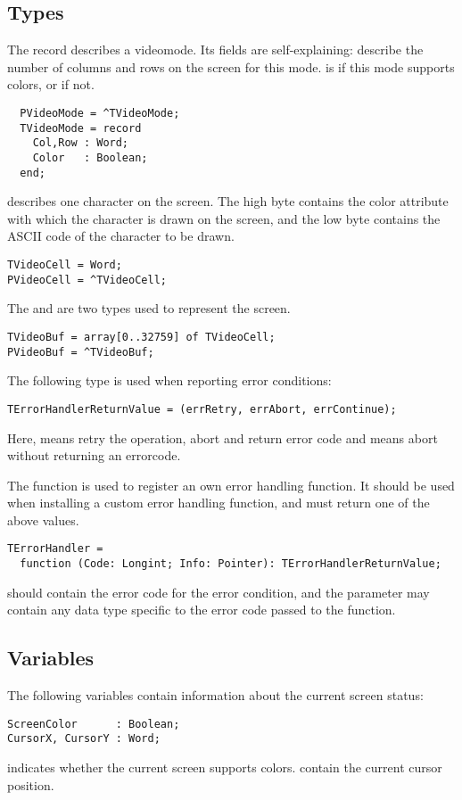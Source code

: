 \subsection{Types}
The  record describes a videomode. Its fields are
self-explaining:  describe the number of columns and 
rows on the screen for this mode.  is  if this mode
supports colors, or  if not.
\begin{verbatim}
  PVideoMode = ^TVideoMode;
  TVideoMode = record
    Col,Row : Word;
    Color   : Boolean;
  end;
\end{verbatim}
 describes one character on the screen. The high byte
contains the color attribute with which the character is drawn on the screen,
and the low byte contains the ASCII code of the character to be drawn.
\begin{verbatim}
TVideoCell = Word;
PVideoCell = ^TVideoCell;
\end{verbatim}
The  and  are two types used to represent the
screen.
\begin{verbatim}
TVideoBuf = array[0..32759] of TVideoCell;
PVideoBuf = ^TVideoBuf;
\end{verbatim}
The following type is used when reporting error conditions:
\begin{verbatim}
TErrorHandlerReturnValue = (errRetry, errAbort, errContinue);
\end{verbatim}
Here,  means retry the operation, 
abort and return error code and  means abort
without returning an errorcode.

The  function is used to register an own error
handling function. It should be used when installing a custom error
handling function, and must return one of the above values.
\begin{verbatim}
TErrorHandler = 
  function (Code: Longint; Info: Pointer): TErrorHandlerReturnValue;
\end{verbatim}
 should contain the error code for the error condition, 
and the  parameter may contain any data type specific to 
the error code passed to the function.

\subsection{Variables}
The following variables contain information about the current screen
status:
\begin{verbatim}
ScreenColor      : Boolean;
CursorX, CursorY : Word;
\end{verbatim}
 indicates whether the current screen supports colors.
 contain the current cursor position.

